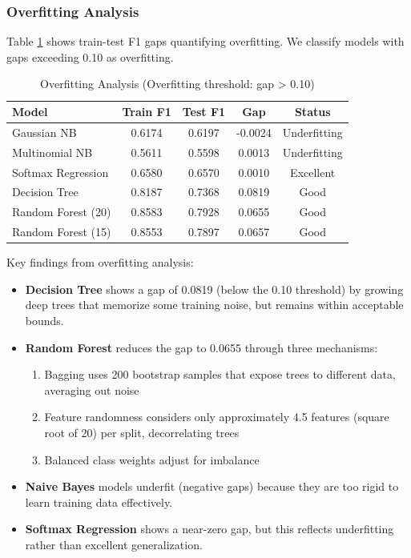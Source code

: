 \documentclass[11pt, a4paper]{article}
\begin{document}
\subsubsection{Overfitting Analysis}

Table \ref{tab:overfitting} shows train-test F1 gaps quantifying overfitting. We classify models with gaps exceeding 0.10 as overfitting.

\begin{table}[H]
    \centering
    \caption{Overfitting Analysis (Overfitting threshold: gap > 0.10)}
    \label{tab:overfitting}
    \begin{tabular}{lcccc}
        \toprule
        \textbf{Model} & \textbf{Train F1} & \textbf{Test F1} & \textbf{Gap} & \textbf{Status} \\
        \midrule
        Gaussian NB & 0.6174 & 0.6197 & -0.0024 & Underfitting \\
        Multinomial NB & 0.5611 & 0.5598 & 0.0013 & Underfitting \\
        Softmax Regression & 0.6580 & 0.6570 & 0.0010 & Excellent \\
        Decision Tree & 0.8187 & 0.7368 & 0.0819 & Good \\
        Random Forest (20) & 0.8583 & 0.7928 & 0.0655 & Good \\
        Random Forest (15) & 0.8553 & 0.7897 & 0.0657 & Good \\
        \bottomrule
    \end{tabular}
\end{table}

Key findings from overfitting analysis:

\begin{itemize}
    \item \textbf{Decision Tree} shows a gap of 0.0819 (below the 0.10 threshold) by growing deep trees that memorize some training noise, but remains within acceptable bounds.
    
    \item \textbf{Random Forest} reduces the gap to 0.0655 through three mechanisms:
    \begin{enumerate}
        \item Bagging uses 200 bootstrap samples that expose trees to different data, averaging out noise
        \item Feature randomness considers only approximately 4.5 features (square root of 20) per split, decorrelating trees
        \item Balanced class weights adjust for imbalance
    \end{enumerate}
    
    \item \textbf{Naive Bayes} models underfit (negative gaps) because they are too rigid to learn training data effectively.
    
    \item \textbf{Softmax Regression} shows a near-zero gap, but this reflects underfitting rather than excellent generalization.
\end{itemize}
\end{document}
